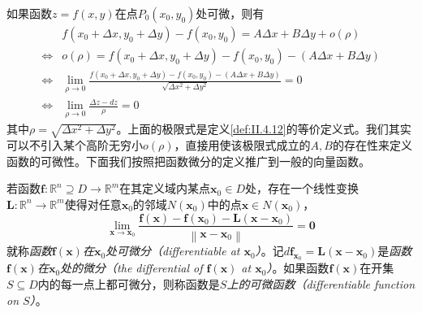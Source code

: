 \documentclass[main.tex]{subfiles}
\begin{document}
如果函数$z=f\left(x,y\right)$在点$P_0\left(x_0,y_0\right)$处可微，则有
\begin{align*}
                    & f\left(x_0+\Delta x,y_0+\Delta y\right)-f\left(x_0,y_0\right)=A\Delta x+B\Delta y+o\left(\rho\right)                                                 \\
    \Leftrightarrow & o\left(\rho\right)=f\left(x_0+\Delta x,y_0+\Delta y\right)-f\left(x_0,y_0\right)-\left(A\Delta x+B\Delta y\right)                                    \\
    \Leftrightarrow & \lim_{\rho\to0}\frac{f\left(x_0+\Delta x,y_0+\Delta y\right)-f\left(x_0,y_0\right)-\left(A\Delta x+B\Delta y\right)}{\sqrt{\Delta x^2+\Delta y^2}}=0 \\
    \Leftrightarrow & \lim_{\rho\to0}\frac{\Delta z-dz}{\rho}=0
\end{align*}
其中$\rho=\sqrt{\Delta x^2+\Delta y^2}$。上面的极限式是定义\ref{def:II.4.12}的等价定义式。我们其实可以不引入某个高阶无穷小$o\left(\rho\right)$，直接用使该极限式成立的$A,B$的存在性来定义函数的可微性。下面我们按照把函数微分的定义推广到一般的向量函数。

\begin{definition}[向量值函数的微分]\label{def:II.4.13}
    若函数$\mathbf{f}:\mathbb{R}^n\supseteq D\rightarrow\mathbb{R}^m$在其定义域内某点$\mathbf{x}_0\in D$处，存在一个线性变换$\mathbf{L}:\mathbb{R}^n\rightarrow\mathbb{R}^m$使得对任意$\mathbf{x}_0$的邻域$N\left(\mathbf{x}_0\right)$中的点$\mathbf{x}\in N\left(\mathbf{x}_0\right)$，
    \[\lim_{\mathbf{x}\rightarrow\mathbf{x}_0}\frac{\mathbf{f}\left(\mathbf{x}\right)-\mathbf{f}\left(\mathbf{x}_0\right)-\mathbf{L}\left(\mathbf{x}-\mathbf{x}_0\right)}{\left\|\mathbf{x}-\mathbf{x}_0\right\|}=\mathbf{0}\]
    就称\emph{函数$\mathbf{f}\left(\mathbf{x}\right)$在$\mathbf{x}_0$处可微分（differentiable at $\mathbf{x}_0$）}。记$d\mathbf{f}_{\mathbf{x}_0}=\mathbf{L}\left(\mathbf{x}-\mathbf{x}_0\right)$是\emph{函数$\mathbf{f}\left(\mathbf{x}\right)$在$\mathbf{x}_0$处的微分（the differential of $\mathbf{f}\left(\mathbf{x}\right)$ at $\mathbf{x}_0$）}。如果函数$\mathbf{f}\left(\mathbf{x}\right)$在开集$S\subseteq D$内的每一点上都可微分，则称函数是\emph{$S$上的可微函数（differentiable function on $S$）}。
\end{definition}
\end{document}
